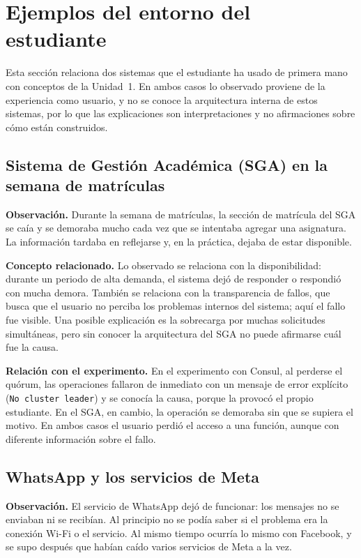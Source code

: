 \documentclass[12pt,a4paper]{article}
\begin{document}
\section{Ejemplos del entorno del estudiante}

Esta sección relaciona dos sistemas que el estudiante ha usado de primera mano con conceptos de
la Unidad~1. En ambos casos lo observado proviene de la experiencia como usuario, y no se
conoce la arquitectura interna de estos sistemas, por lo que las explicaciones son
interpretaciones y no afirmaciones sobre cómo están construidos.

\subsection{Sistema de Gestión Académica (SGA) en la semana de matrículas}

\textbf{Observación.} Durante la semana de matrículas, la
sección de matrícula del SGA se caía y se demoraba mucho cada vez que se intentaba agregar una
asignatura. La información tardaba en reflejarse y, en la práctica, dejaba de estar disponible.

\textbf{Concepto relacionado.} Lo observado se relaciona con la disponibilidad: durante un
periodo de alta demanda, el sistema dejó de responder o respondió con mucha demora. También se
relaciona con la transparencia de fallos, que busca que el usuario no perciba los problemas
internos del sistema; aquí el fallo fue visible. Una posible explicación es la sobrecarga por
muchas solicitudes simultáneas, pero sin conocer la arquitectura del SGA no puede afirmarse
cuál fue la causa.

\textbf{Relación con el experimento.} En el experimento con Consul, al perderse el quórum, las
operaciones fallaron de inmediato con un mensaje de error explícito (\texttt{No cluster
leader}) y se conocía la causa, porque la provocó el propio estudiante. En el SGA, en cambio,
la operación se demoraba sin que se supiera el motivo. En ambos casos el usuario perdió el
acceso a una función, aunque con diferente información sobre el fallo.

\subsection{WhatsApp y los servicios de Meta}

\textbf{Observación.} El servicio de WhatsApp dejó de funcionar:
los mensajes no se enviaban ni se recibían. Al principio no se  podía saber si el
problema era la conexión Wi-Fi o el servicio. Al mismo tiempo ocurría lo mismo con Facebook, y
se supo después que habían caído varios servicios de Meta a la vez.
\end{document}

